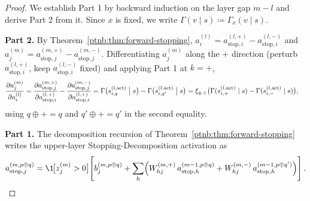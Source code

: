 \begin{proof}
We establish Part 1 by backward induction on the layer gap $m - l$ and derive Part 2 from it. Since
$x$ is fixed, we write $\Gamma(v \mid s) \coloneqq \Gamma_x(v \mid s)$.

\textbf{Part 2.} By Theorem~\ref{ptnb:thm:forward-stopping}, $a_i^{(l)} = a_{\mathrm{stop},i}^{(l,+)} -
    a_{\mathrm{stop},i}^{(l,-)}$ and $a_j^{(m)} = a_{\mathrm{stop},j}^{(m,+)} -
    a_{\mathrm{stop},j}^{(m,-)}$. Differentiating $a_j^{(m)}$ along the $+$ direction (perturb
$a_{\mathrm{stop},i}^{(l,+)}$, keep $a_{\mathrm{stop},i}^{(l,-)}$ fixed) and applying Part 1 at
$k=+$,
\begin{align}
    \frac{\partial a_j^{(m)}}{\partial a_i^{(l)}}
    &= \frac{\partial a_{\mathrm{stop},j}^{(m,+)}}{\partial a_{\mathrm{stop},i}^{(l,+)}}
    - \frac{\partial a_{\mathrm{stop},j}^{(m,-)}}{\partial a_{\mathrm{stop},i}^{(l,+)}}
    = \Gamma\bigl(s_{i, q}^{(l, \mathrm{act})} \bigm| s\bigr) - \Gamma\bigl(s_{i, q'}^{(l,
    \mathrm{act})} \bigm| s\bigr)
    = \xi_{q,+}\bigl(\Gamma(s_{i,+}^{(l, \mathrm{act})} \mid s) - \Gamma(s_{i,-}^{(l, \mathrm{act})}
    \mid s)\bigr),
\end{align}
using $q \oplus + = q$ and $q' \oplus + = q'$ in the second equality.

\textbf{Part 1.} The decomposition recursion of Theorem~\ref{ptnb:thm:forward-stopping} writes the
upper-layer Stopping-Decomposition activation as
\begin{align}\label{ptnb:eq:adf-astop-recursion}
    a_{\mathrm{stop},j}^{(m, p \oplus q)}
    = \1\!\bigl[z_j^{(m)} > 0\bigr]\!\left[
    b_j^{(m, p \oplus q)}
    + \sum_h \Bigl( W_{hj}^{(m,+)}\, a_{\mathrm{stop},h}^{(m-1, p \oplus q)} + W_{hj}^{(m,-)}\,
    a_{\mathrm{stop},h}^{(m-1, p \oplus q')} \Bigr)
    \right].
\end{align}


\end{proof}
